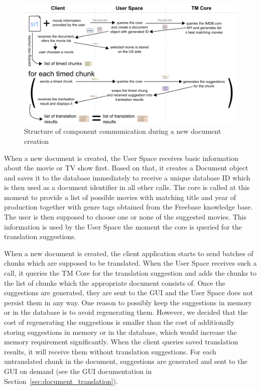 \begin{figure}
\begin{center}
\includegraphics{figures/creating_document.pdf}
\end{center}
\caption{Structure of component communication during a new document creation}
\end{figure}

When a new document is created, the User Space receives basic information about the movie or TV show first. Based on that, it creates a Document object and saves it to the database immediately to receive a unique database ID which is then used as a document identifier in all other calls. The core is called at this moment to provide a list of possible movies with matching title and year of production together with genre tags obtained from the Freebase knowledge base. The user is then supposed to choose one or none of the suggested movies. This information is used by the User Space the moment the core is queried for the translation suggestions.

When a new document is created, the client application starts to send batches of chunks which are supposed to be translated. When the User Space receives such a call, it queries the TM Core for the translation suggestion and adds the chunks to the list of chunks which the appropriate document consists of. Once the suggestions are generated, they are sent to the GUI and the User Space does not persist them in any way. One reason to possibly keep the suggestions in memory or in the database is to avoid regenerating them. However, we decided that the cost of regenerating the suggestions is smaller than the cost of additionally storing suggestions in memory or in the database, which would increase the memory requirement significantly. When the client queries saved translation results, it will receive them without translation suggestions. For each untranslated chunk in the document, suggestions are generated and sent to the GUI on demand (see the GUI documentation in Section~\ref{sec:document_translation}).

